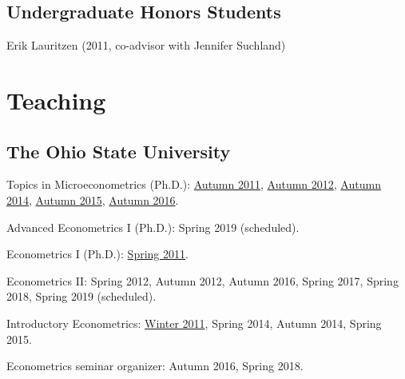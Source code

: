 \documentclass[10pt,letterpaper]{article}
\renewenvironment{itemize}{
  \begin{list}{}{
      \setlength{\leftmargin}{1.5em}
      \setlength{\itemsep}{0.25em}
      \setlength{\parskip}{0pt}
      \setlength{\parsep}{0.25em}
    }
}{
  \end{list}
}
\begin{document}
\subsection*{Undergraduate Honors Students}

\begin{itemize}
\item Erik Lauritzen (2011, co-advisor with Jennifer Suchland)
\end{itemize}

\section*{Teaching}

\subsection*{The Ohio State University}

\begin{itemize}
\item Topics in Microeconometrics (Ph.D.):
  \href{https://jblevins.org/courses/econ843f11/}{Autumn 2011}, %
  \href{https://jblevins.org/courses/econ8833f12/}{Autumn 2012}, %
  \href{https://jblevins.org/courses/econ8833f14/}{Autumn 2014}, %
  \href{https://jblevins.org/courses/econ8833f15/}{Autumn 2015}, %
  \href{https://jblevins.org/courses/econ8833f16/}{Autumn 2016}. %
\item Advanced Econometrics I (Ph.D.):
  Spring 2019 (scheduled). %
\item Econometrics I (Ph.D.):
  \href{https://jblevins.org/courses/econ741s11/}{Spring 2011}. %
\item Econometrics II:
  Spring 2012, %
  Autumn 2012, %
  Autumn 2016, %
  Spring 2017, %
  Spring 2018, %
  Spring 2019 (scheduled). %
\item Introductory Econometrics:
  \href{https://jblevins.org/courses/econ444w11/}{Winter 2011}, %
  Spring 2014, %
  Autumn 2014, %
  Spring 2015. %
\item Econometrics seminar organizer:
  Autumn 2016, Spring 2018.
\end{itemize}
\end{document}
